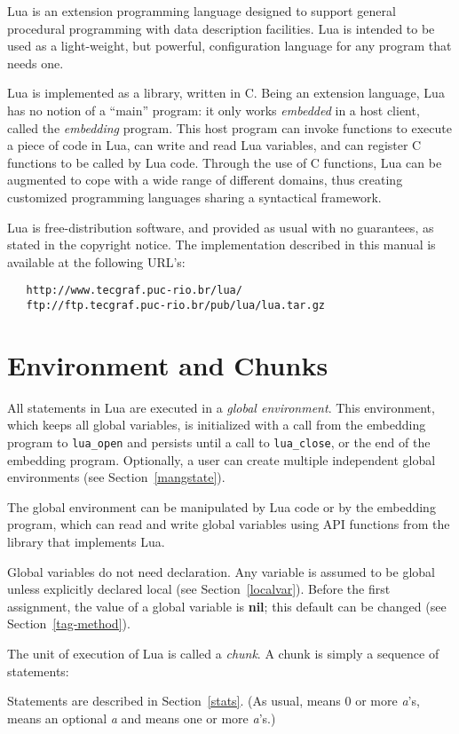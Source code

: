 \documentclass[11pt]{article}
\newcommand{\See}[1]{Section~\ref{#1}}
\newcommand{\see}[1]{(see \See{#1})}
\newcommand{\nil}{{\bf nil}}
\newcommand{\Index}[1]{#1\index{#1}}
\newcommand{\Def}[1]{\emph{#1}\index{#1}}
\begin{document}
Lua is an extension programming language designed to support
general procedural programming with data description
facilities.
Lua is intended to be used as a light-weight, but powerful,
configuration language for any program that needs one.

Lua is implemented as a library, written in C.
Being an extension language, Lua has no notion of a ``main'' program:
it only works \emph{embedded} in a host client,
called the \emph{embedding} program.
This host program can invoke functions to execute a piece of
code in Lua, can write and read Lua variables,
and can register C functions to be called by Lua code.
Through the use of C functions, Lua can be augmented to cope with
a wide range of different domains,
thus creating customized programming languages sharing a syntactical framework.

Lua is free-distribution software,
and provided as usual with no guarantees,
as stated in the copyright notice.
The implementation described in this manual is available
at the following URL's:
\begin{verbatim}
   http://www.tecgraf.puc-rio.br/lua/
   ftp://ftp.tecgraf.puc-rio.br/pub/lua/lua.tar.gz
\end{verbatim}


\section{Environment and Chunks}

All statements in Lua are executed in a \Def{global environment}.
This environment, which keeps all global variables,
is initialized with a call from the embedding program to
\verb|lua_open| and
persists until a call to \verb|lua_close|,
or the end of the embedding program.
Optionally, a user can create multiple independent global
environments \see{mangstate}.

The global environment can be manipulated by Lua code or
by the embedding program,
which can read and write global variables
using API functions from the library that implements Lua.

\Index{Global variables} do not need declaration.
Any variable is assumed to be global unless explicitly declared local
\see{localvar}.
Before the first assignment, the value of a global variable is \nil;
this default can be changed \see{tag-method}.

The unit of execution of Lua is called a \Def{chunk}.
A chunk is simply a sequence of statements:
\begin{Produc}
\end{Produc}%
Statements are described in \See{stats}.
(As usual,  means 0 or more \emph{a}'s,
 means an optional \emph{a} and  means
one or more \emph{a}'s.)
\end{document}
